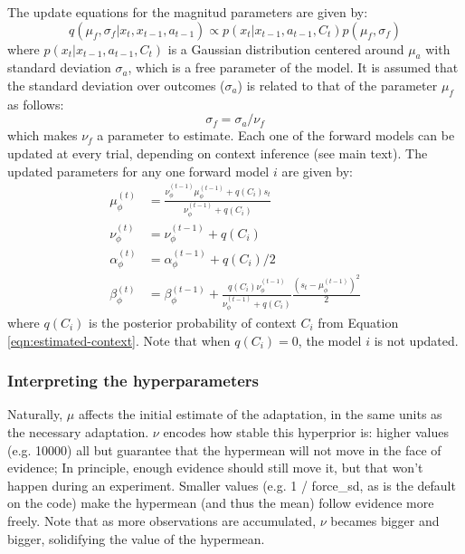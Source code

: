 \documentclass[a4paper,doc,floatsintext,natbib]{apa6}
\def \eref #1{Equation \ref{#1}}   %
\begin{document}
The update equations for the magnitud parameters are given by:
\begin{equation}
q(\mu_f, \sigma_f | x_t, x_{t-1}, a_{t-1}) \propto p(x_t |
x_{t-1}, a_{t-1}, C_t)p(\mu_f, \sigma_f) \label{eqn:context-from-x}
\end{equation}
where $p(x_t | x_{t-1}, a_{t-1}, C_t)$ is a Gaussian distribution centered
around $\mu_a$ with standard deviation $\sigma_a$, which is a free parameter of
the model. It is assumed that the standard deviation over outcomes ($\sigma_a$)
is related to that of the parameter $\mu_f$ as follows:
\begin{equation}
\sigma_f = \sigma_a / \nu_f
\end{equation}
which makes $\nu_f$ a parameter to estimate. Each one of the forward models can
be updated at every trial, depending on context inference (see main text). The
updated parameters for any one forward model $i$ are given by:
\begin{align}
  \mu_\phi^{(t)} &= \frac{\nu_\phi^{(t-1)} \mu_\phi^{(t-1)} + q(C_i)s_t}{\nu_\phi^{(t-1)} + q(C_i)} \\
  \nu_\phi^{(t)} &= \nu_\phi^{(t-1)} + q(C_i) \\
  \alpha_\phi^{(t)} &= \alpha_\phi^{(t-1)} + q(C_i) / 2 \\
  \beta_\phi^{(t)} &= \beta_\phi^{(t-1)} + \frac{q(C_i)\nu_\phi^{(t-1)}}{\nu_\phi^{(t-1)} +
                  q(C_i)}\frac{\left(s_t - \mu_\phi^{(t-1)}\right)^2}{2}
\end{align}
where $q(C_i)$ is the posterior probability of context $C_i$ from
\eref{eqn:estimated-context}. Note that when $q(C_i) = 0$, the model $i$ is not
updated.

\subsubsection{Interpreting the hyperparameters}
Naturally, $\mu$ affects the initial estimate of the adaptation, in the same
units as the necessary adaptation. $\nu$ encodes how stable this hyperprior is:
higher values (e.g. 10000) all but guarantee that the hypermean will not move
in the face of evidence; In principle, enough evidence should still move it,
but that won't happen during an experiment. Smaller values (e.g. 1 / force\_sd,
as is the default on the code) make the hypermean (and thus the mean) follow
evidence more freely. Note that as more observations are accumulated, $\nu$
becames bigger and bigger, solidifying the value of the hypermean.
\end{document}
